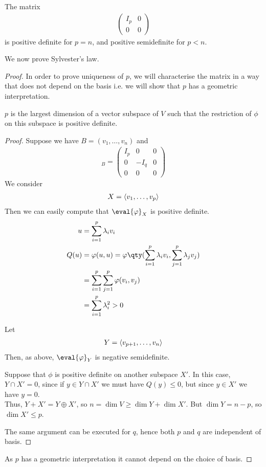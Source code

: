 \begin{example}
	The matrix
	\begin{align*}
		\begin{pmatrix}
			I_p & 0 \\
			0   & 0
		\end{pmatrix}
	\end{align*}
	is positive definite for $p = n$, and positive semidefinite for $p < n$.
\end{example}

We now prove Sylvester's law.

\begin{proof}
	In order to prove uniqueness of $p$, we will characterise the matrix in a way that does not depend on the basis i.e. we will show that $p$ has a geometric interpretation.

	\begin{claim}
		$p$ is the largest dimension of a vector subspace of $V$ such that the restriction of $\phi$ on this subspace is positive definite.
	\end{claim} 

	\begin{proof}
		Suppose we have $B = (v_1, \dots, v_n)$ and
		\begin{align*}
			[\phi]_B = \begin{pmatrix}
				I_p & 0    & 0 \\
				0   & -I_q & 0 \\
				0   & 0    & 0
			\end{pmatrix}
		\end{align*}
		We consider
		\begin{align*}
			X = \langle{} v_1, \dots, v_p \rangle
		\end{align*}
		Then we can easily compute that $\eval{\phi}_X$ is positive definite.
		\begin{align*}
			u &= \sum_{i=1}^{p} \lambda_i v_i \\
			Q(u) &= \phi(u, u) = \phi\qty(\sum_{i=1}^{p} \lambda_i v_i, \sum_{j=1}^{p} \lambda_j v_j) \\
			&= \sum_{i=1}^{p} \sum_{j=1}^{p} \phi(v_i, v_j) \\
			&= \sum_{i=1}^{p} \lambda^2_i > 0
		\end{align*} 

		Let
		\begin{align*}
			Y = \langle{} v_{p+1}, \dots, v_n \rangle
		\end{align*}
		Then, as above, $\eval{\phi}_Y$ is negative semidefinite.

		Suppose that $\phi$ is positive definite on another subspace $X'$.
		In this case, $Y \cap X' = \qty{0}$, since if $y \in Y \cap X'$ we must have $Q(y) \leq 0$, but since $y \in X'$ we have $y = 0$. \\
		Thus, $Y + X' = Y \oplus X'$, so $n = \dim V \geq \dim Y + \dim X'$.
		But $\dim Y = n - p$, so $\dim X' \leq p$.


		The same argument can be executed for $q$, hence both $p$ and $q$ are independent of basis.
	\end{proof} 

	As $p$ has a geometric interpretation it cannot depend on the choice of basis.
\end{proof}

